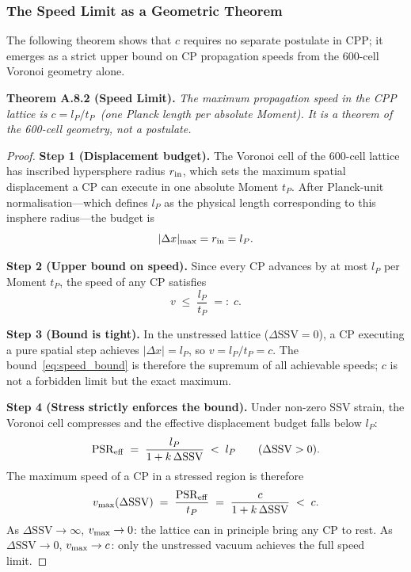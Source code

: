 \documentclass[11pt,letterpaper]{article}
\begin{document}
\subsubsection{The Speed Limit as a Geometric Theorem}
\label{app:A82}

The following theorem shows that $c$ requires no separate postulate in CPP;
it emerges as a strict upper bound on CP propagation speeds from the
600-cell Voronoi geometry alone.

\begin{mdframed}[linewidth=1pt, innertopmargin=8pt, innerbottommargin=8pt]
\textbf{Theorem A.8.2 (Speed Limit).}\;
\textit{The maximum propagation speed in the CPP lattice is
$c = l_P/t_P$~(one Planck length per absolute Moment).
It is a theorem of the 600-cell geometry, not a postulate.}
\end{mdframed}

\begin{proof}
\textbf{Step 1 (Displacement budget).}
The Voronoi cell of the 600-cell lattice has inscribed hypersphere
radius $r_{\rm in}$, which sets the maximum spatial displacement a CP
can execute in one absolute Moment $t_P$.
After Planck-unit normalisation---which defines $l_P$ as the physical
length corresponding to this insphere radius---the budget is
\begin{equation}
  |\Delta x|_{\rm max} = r_{\rm in} = l_P.
  \label{eq:budget}
\end{equation}

\textbf{Step 2 (Upper bound on speed).}
Since every CP advances by at most $l_P$ per Moment $t_P$, the speed
of any CP satisfies
\begin{equation}
  v \;\leq\; \frac{l_P}{t_P} \;=:\; c.
  \label{eq:speed_bound}
\end{equation}

\textbf{Step 3 (Bound is tight).}
In the unstressed lattice ($\Delta\mathrm{SSV} = 0$), a CP executing a
pure spatial step achieves $|\Delta x| = l_P$, so $v = l_P/t_P = c$.
The bound~\eqref{eq:speed_bound} is therefore the supremum of all
achievable speeds; $c$ is not a forbidden limit but the exact maximum.

\textbf{Step 4 (Stress strictly enforces the bound).}
Under non-zero SSV strain, the Voronoi cell compresses and the
effective displacement budget falls below $l_P$:
\begin{equation}
  \mathrm{PSR}_{\rm eff}
  \;=\; \frac{l_P}{1 + k\,\Delta\mathrm{SSV}}
  \;<\; l_P
  \qquad (\Delta\mathrm{SSV} > 0).
  \label{eq:PSR_stressed}
\end{equation}
The maximum speed of a CP in a stressed region is therefore
\begin{equation}
  v_{\rm max}(\Delta\mathrm{SSV})
  \;=\; \frac{\mathrm{PSR}_{\rm eff}}{t_P}
  \;=\; \frac{c}{1 + k\,\Delta\mathrm{SSV}}
  \;<\; c.
  \label{eq:v_stressed}
\end{equation}
As $\Delta\mathrm{SSV} \to \infty$, $v_{\rm max} \to 0$: the lattice can
in principle bring any CP to rest.
As $\Delta\mathrm{SSV} \to 0$, $v_{\rm max} \to c$: only the
unstressed vacuum achieves the full speed limit.
\end{proof}
\end{document}
